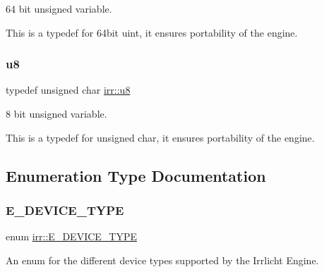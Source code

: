 64 bit unsigned variable. 

This is a typedef for 64bit uint, it ensures portability of the engine. \mbox{\label{namespaceirr_a646874f69af8ff87fc10201b0254a761}} 
\subsubsection{\texorpdfstring{u8}{u8}}
{\footnotesize\ttfamily typedef unsigned char \hyperlink{namespaceirr_a646874f69af8ff87fc10201b0254a761}{irr\+::u8}}



8 bit unsigned variable. 

This is a typedef for unsigned char, it ensures portability of the engine. 

\subsection{Enumeration Type Documentation}
\mbox{\label{namespaceirr_ac25d94cf2e1037c7ca18ee79b3bd4505}} 
\subsubsection{\texorpdfstring{E\+\_\+\+D\+E\+V\+I\+C\+E\+\_\+\+T\+Y\+PE}{E\_DEVICE\_TYPE}\hspace{0.1cm}{\footnotesize\ttfamily [1/2]}}
{\footnotesize\ttfamily enum \hyperlink{namespaceirr_ac25d94cf2e1037c7ca18ee79b3bd4505}{irr\+::\+E\+\_\+\+D\+E\+V\+I\+C\+E\+\_\+\+T\+Y\+PE}}



An enum for the different device types supported by the Irrlicht Engine. 

